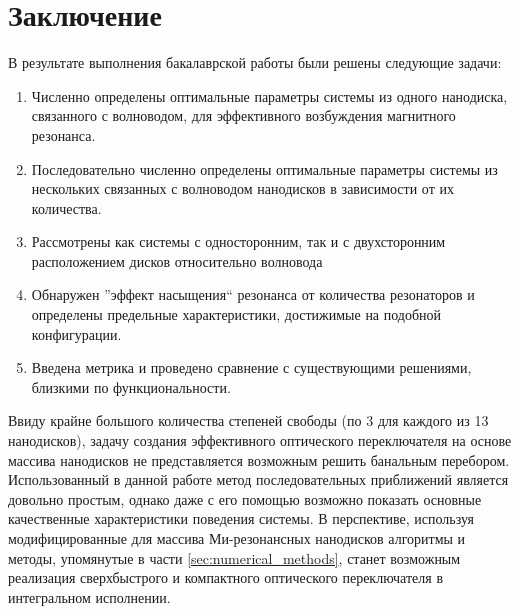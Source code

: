 \chapter{Заключение}

В результате выполнения бакалаврской работы были решены следующие задачи:

\begin{enumerate}[label=\arabic*)]
	\item Численно определены оптимальные параметры системы из одного нанодиска, связанного с волноводом, для эффективного возбуждения магнитного резонанса.
	\item Последовательно численно определены оптимальные параметры системы из нескольких связанных с волноводом нанодисков в зависимости от их количества.
	\item Рассмотрены как системы с односторонним, так и с двухсторонним расположением дисков относительно волновода
	\item Обнаружен ''эффект насыщения`` резонанса от количества резонаторов и определены предельные характеристики, достижимые на подобной конфигурации.
	\item Введена метрика и проведено сравнение с существующими решениями, близкими по функциональности. 
\end{enumerate}

Ввиду крайне большого количества степеней свободы (по 3 для каждого из 13 нанодисков), задачу создания эффективного оптического переключателя на основе массива нанодисков не представляется возможным решить банальным перебором. Использованный в данной работе метод последовательных приближений является довольно простым, однако даже с его помощью возможно показать основные качественные характеристики поведения системы. В перспективе, используя модифицированные для массива Ми-резонансных нанодисков алгоритмы и методы, упомянутые в части \ref{sec:numerical_methods}, станет возможным реализация сверхбыстрого и компактного оптического переключателя в интегральном исполнении.